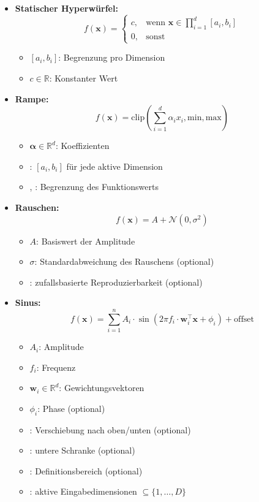 \begin{otherlanguage}{ngerman}
\begin{itemize}
  \item \textbf{Statischer Hyperwürfel:}
    \[
    f(\mathbf{x}) =
    \begin{cases}
      c, & \text{wenn } \mathbf{x} \in \prod_{i=1}^d [a_i, b_i] \\
      0, & \text{sonst}
    \end{cases}
    \]
    \begin{itemize}
      \item $[a_i, b_i]$: Begrenzung pro Dimension
      \item $c \in \mathbb{R}$: Konstanter Wert
    \end{itemize}

  \item \textbf{Rampe:}
    \[
    f(\mathbf{x}) = \mathrm{clip}\left( \sum_{i=1}^d \alpha_i x_i, \text{min}, \text{max} \right)
    \]
    \begin{itemize}
      \item $\boldsymbol{\alpha} \in \mathbb{R}^d$: Koeffizienten
      \item {}: $[a_i, b_i]$ für jede aktive Dimension
      \item {}, : Begrenzung des Funktionswerts
    \end{itemize}

  \item \textbf{Rauschen:}
    \[
    f(\mathbf{x}) = A + \mathcal{N}(0, \sigma^2)
    \]
    \begin{itemize}
      \item $A$: Basiswert der Amplitude
      \item $\sigma$: Standardabweichung des Rauschens (optional)
      \item {}: zufallsbasierte Reproduzierbarkeit (optional)
    \end{itemize}

  \item \textbf{Sinus:}
    \[
    f(\mathbf{x}) = \sum_{i=1}^{n} A_i \cdot \sin(2\pi f_i \cdot \mathbf{w}_i^\top \mathbf{x} + \phi_i) + \text{offset}
    \]
    \begin{itemize}
      \item $A_i$: Amplitude
      \item $f_i$: Frequenz
      \item $\mathbf{w}_i \in \mathbb{R}^d$: Gewichtungsvektoren
      \item $\phi_i$: Phase (optional)
      \item {}: Verschiebung nach oben/unten (optional)
      \item {}: untere Schranke (optional)
      \item {}: Definitionsbereich (optional)
      \item {}: aktive Eingabedimensionen $\subseteq \{1, \dots, D\}$
    \end{itemize}
\end{itemize}




\end{otherlanguage}
